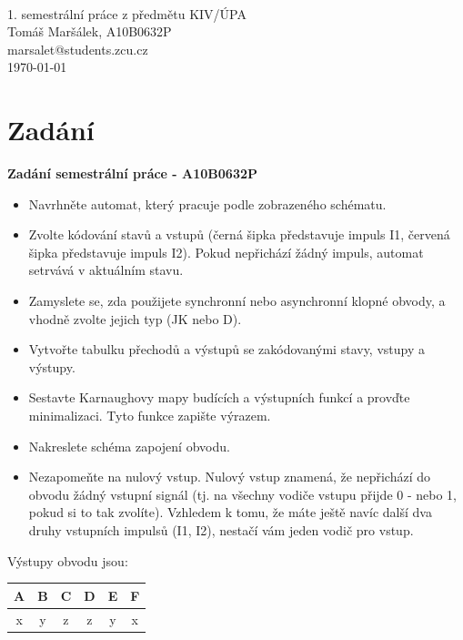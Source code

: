 \documentclass[titlepage]{article}
\begin{document}
\begin{titlepage}
\begin{center}
	\mbox{} \\[3cm]
	\huge{1. semestrální práce z předmětu KIV/ÚPA} \\[2.5cm]
	\Large{Tomáš Maršálek, A10B0632P} \\
	\large{marsalet@students.zcu.cz} \\[1cm]
	\normalsize{\today}
\end{center}
\thispagestyle{empty}
\end{titlepage}



\section{Zadání}
\large{\textbf{Zadání semestrální práce - A10B0632P}}
\begin{itemize}
\item Navrhněte automat, který pracuje podle zobrazeného schématu.
\item Zvolte kódování stavů a vstupů (černá šipka představuje impuls I1,
		červená šipka představuje impuls I2). Pokud nepřichází žádný impuls, automat
setrvává v aktuálním stavu.
\item Zamyslete se, zda použijete synchronní nebo asynchronní klopné
obvody, a vhodně zvolte jejich typ (JK nebo D).
\item Vytvořte tabulku přechodů a výstupů se zakódovanými stavy, vstupy a
výstupy.
\item Sestavte Karnaughovy mapy budících a výstupních funkcí a provďte
minimalizaci. Tyto funkce zapište výrazem.
\item Nakreslete schéma zapojení obvodu.
\item Nezapomeňte na nulový vstup. Nulový vstup znamená, že nepřichází do
obvodu žádný vstupní signál (tj. na všechny vodiče vstupu přijde 0 - nebo 1,
		pokud si to tak zvolíte). Vzhledem k tomu, že máte ještě navíc další dva druhy
vstupních impulsů (I1, I2), nestačí vám jeden vodič pro vstup.
\end{itemize}

Výstupy obvodu jsou:

\begin{center}
\begin{tabular}{|c|c|c|c|c|c|}
\hline
{\bf A} & {\bf B} & {\bf C} & {\bf D} & {\bf E} & {\bf F} \\
\hline
x & y & z & z & y & x \\
\hline
\end{tabular}
\end{center}
\end{document}
